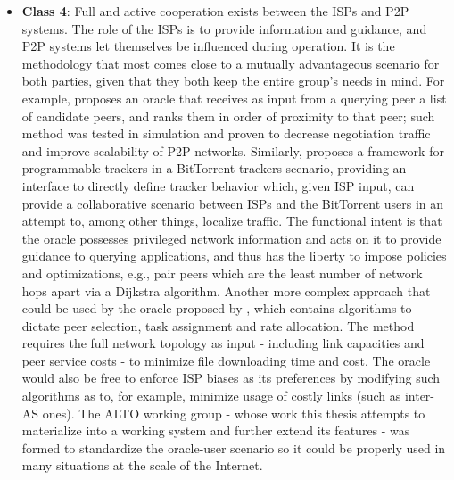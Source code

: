 \begin{itemize}
        \item \textbf{Class 4}:
            Full and active cooperation exists between the ISPs and P2P systems.
            The role of the ISPs is to provide information and guidance, and P2P systems let themselves be influenced during operation.
            It is the methodology that most comes close to a mutually advantageous scenario for both parties, given that they both keep the entire group's needs in mind.
            For example, \cite{locality-aware-p2p} proposes an oracle that receives as input from a querying peer a list of candidate peers, and ranks them in order of proximity to that peer; such method was tested in simulation and proven to decrease negotiation traffic and improve scalability of P2P networks.
            Similarly, \cite{configurable-trackers} proposes a framework for programmable trackers in a BitTorrent trackers scenario, providing an interface to directly define tracker behavior which, given ISP input, can provide a collaborative scenario between ISPs and the BitTorrent users in an attempt to, among other things, localize traffic.
            The functional intent is that the oracle possesses privileged network information and acts on it to provide guidance to querying applications, and thus has the liberty to impose policies and optimizations, e.g., pair peers which are the least number of network hops apart via a Dijkstra algorithm.
            Another more complex approach that could be used by the oracle proposed by \cite{han2009}, which contains algorithms to dictate peer selection, task assignment and rate allocation.
            The method requires the full network topology as input - including link capacities and peer service costs - to minimize file downloading time and cost.
            The oracle would also be free to enforce ISP biases as its preferences by modifying such algorithms as to, for example, minimize usage of costly links (such as inter-AS ones).
            The ALTO working group - whose work this thesis attempts to materialize into a working system and further extend its features - was formed to standardize the oracle-user scenario so it could be properly used in many situations at the scale of the Internet.

    \end{itemize}

